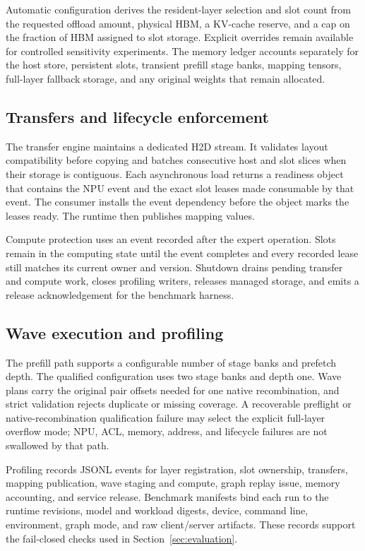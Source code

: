 Automatic configuration derives the resident-layer selection and slot count
from the requested offload amount, physical HBM, a KV-cache reserve, and a cap
on the fraction of HBM assigned to slot storage. Explicit overrides remain
available for controlled sensitivity experiments. The memory ledger accounts
separately for the host store, persistent slots, transient prefill stage banks,
mapping tensors, full-layer fallback storage, and any original weights that
remain allocated.

\subsection{Transfers and lifecycle enforcement}

The transfer engine maintains a dedicated H2D stream. It validates layout
compatibility before copying and batches consecutive host and slot slices when
their storage is contiguous. Each asynchronous load returns a readiness object
that contains the NPU event and the exact slot leases made consumable by that
event. The consumer installs the event dependency before the object marks the
leases ready. The runtime then publishes mapping values.

Compute protection uses an event recorded after the expert operation. Slots
remain in the computing state until the event completes and every recorded
lease still matches its current owner and version. Shutdown drains pending
transfer and compute work, closes profiling writers, releases managed storage,
and emits a release acknowledgement for the benchmark harness.

\subsection{Wave execution and profiling}

The prefill path supports a configurable number of stage banks and prefetch
depth. The qualified configuration uses two stage banks and depth one. Wave
plans carry the original pair offsets needed for one native recombination, and
strict validation rejects duplicate or missing coverage. A recoverable
preflight or native-recombination qualification failure may select the explicit
full-layer overflow mode; NPU, ACL, memory, address, and lifecycle failures are
not swallowed by that path.

Profiling records JSONL events for layer registration, slot ownership,
transfers, mapping publication, wave staging and compute, graph replay issue,
memory accounting, and service release. Benchmark manifests bind each run to
the runtime revisions, model and workload digests, device, command line,
environment, graph mode, and raw client/server artifacts. These records support
the fail-closed checks used in Section~\ref{sec:evaluation}.

